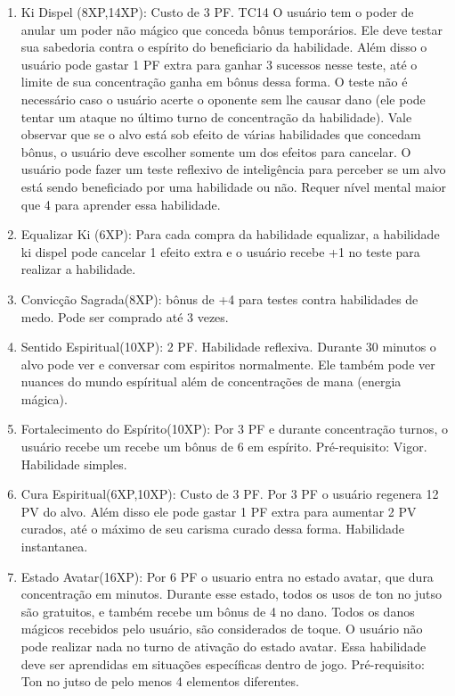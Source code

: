 \begin{enumerate}
  \item Ki Dispel (8XP,14XP): Custo de 3 PF. TC14\newline
O usuário tem o poder de anular um poder não mágico que conceda bônus temporários. Ele deve testar sua sabedoria contra o espírito do beneficiario da habilidade. Além disso o usuário pode gastar 1 PF extra para ganhar 3 sucessos nesse teste, até o limite de sua concentração ganha em bônus dessa forma. O teste não é necessário caso o usuário acerte o oponente sem lhe causar dano (ele pode tentar um ataque no último turno de concentração da habilidade). Vale observar que se o alvo está sob efeito de várias habilidades que concedam bônus, o usuário deve escolher somente um dos efeitos para cancelar. O usuário pode fazer um teste reflexivo de inteligência para perceber se um alvo está sendo beneficiado por uma habilidade ou não. Requer nível mental maior que 4 para aprender essa habilidade.

		\item Equalizar Ki (6XP): Para cada compra da habilidade equalizar, a habilidade ki dispel pode cancelar 1 efeito extra e o usuário recebe +1 no teste para realizar a habilidade.

\item Convicção Sagrada(8XP): bônus de +4 para testes contra habilidades de medo. Pode ser comprado até 3 vezes.

\item Sentido Espiritual(10XP): 2 PF. Habilidade reflexiva.\newline
Durante 30 minutos o alvo pode ver e conversar com espiritos normalmente. Ele também pode ver nuances do mundo espíritual além de concentrações de mana (energia mágica). 

\item Fortalecimento do Espírito(10XP): Por 3 PF e durante concentração turnos, o usuário recebe um recebe um bônus de 6 em espírito. Pré-requisito: Vigor. Habilidade simples.

\item Cura Espiritual(6XP,10XP): Custo de 3 PF.\newline
Por 3 PF o usuário regenera 12 PV do alvo. Além disso ele pode gastar 1 PF extra para aumentar 2 PV curados, até o máximo de seu carisma curado dessa forma. Habilidade instantanea.

\item Estado Avatar(16XP): Por 6 PF o usuario entra no estado avatar, que dura concentração em minutos. Durante esse estado, todos os usos de ton no jutso são gratuitos, e também recebe um bônus de 4 no dano. Todos os danos mágicos recebidos pelo usuário, são considerados de toque. O usuário não pode realizar nada no turno de ativação do estado avatar. Essa habilidade deve ser aprendidas em situações específicas dentro de jogo. Pré-requisito: Ton no jutso de pelo menos 4 elementos diferentes.



\end{enumerate}
